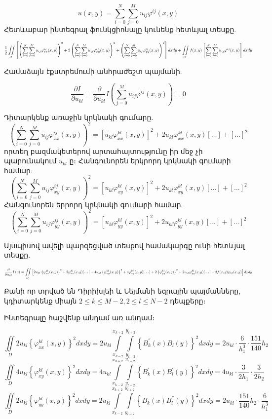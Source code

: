 \documentclass[fleqn, bachelor,subf,12pt,notitlepage]{disser}
\newcommand\scalemath[2]{\scalebox{#1}{\mbox{\ensuremath{\displaystyle #2}}}}
\begin{document}
					$$u(x,y) = \sum_{i=0}^{N} \sum_{j=0}^{M} u_{ij}\varphi^{ij}(x,y)$$
\noindent Հետևաբար ինտեգրալ ֆունկցիոնալը կունենք հետևյալ տեսքը.

$$\scalemath{0.7}{\frac{1}{2} \iint \limits_{D}\left[\left(\sum_{i=0}^{N} \sum_{j=0}^{M}u_{ij}\varphi^{ij}_{xx}(x,y)\right)^2 +  2\left(\sum_{i=0}^{N} \sum_{j=0}^{M}u_{ij}\varphi^{ij}_{xy}(x,y)\right)^2 + \left(\sum_{i=0}^{N} \sum_{j=0}^{M}u_{ij}\varphi^{ij}_{yy}(x,y)\right)^2\right]dxdy + \iint \limits_{D}f(x,y)\left[ \sum_{i=0}^{N} \sum_{j=0}^{M}u_{ij}\varphi^{ij}(x,y)\right]dxdy}$$


\noindent  Համաձայն էքստրեմումի անհրաժեշտ պայմանի.

$$\dfrac{\partial I}{ \partial u_{kl}} = \dfrac{\partial}{\partial u_{kl}} I \left(\sum_{j=0}^{M} u_{ij}\varphi^{ij}(x,y)\right) = 0 $$


\noindent Դիտարկենք առաջին կրկնակի գումարը.
$$\left(\sum_{i=0}^{N} \sum_{j=0}^{M}u_{ij}\varphi_{xx}^{ij}(x,y)\right)^2 = \left[u_{kl}\varphi_{xx}^{kl}(x,y)\right]^{2} + 2u_{kl}\varphi_{xx}^{kl}(x,y)[\dots] + [\dots]^2$$
\noindent որտեղ բազմակետերով արտահայտությունը իր մեջ չի պարունակում $u_{kl}$ ը։
Հանգունորեն երկրորդ կրկնակի գումարի համար.
$$\left(\sum_{i=0}^{N} \sum_{j=0}^{M}u_{ij}\varphi_{xy}^{ij}(x,y)\right)^2 = \left[u_{kl}\varphi_{xy}^{kl}(x,y)\right]^{2} + 2u_{kl}\varphi_{xy}^{kl}(x,y)[\dots] + [\dots]^2$$
Հանգունորեն երրորդ կրկնակի գումարի համար.
$$\left(\sum_{i=0}^{N} \sum_{j=0}^{M}u_{ij}\varphi_{yy}^{ij}(x,y)\right)^2 = \left[u_{kl}\varphi_{yy}^{kl}(x,y)\right]^{2} + 2u_{kl}\varphi_{yy}^{kl}(x,y)[\dots] + [\dots]^2$$



\noindent Այսպիսով ավելի պարզեցված տեսքով համակարգը ունի հետևյալ տեսքը.

$$\scalemath{0.65}{\frac{\partial}{\partial u_{kl}}I \left(u\right)= \iint \limits_{D} \left[2u_{kl}\left\{ \varphi_{xx}^{kl}(x,y)\right\}^{2} + 2\varphi_{xx}^{kl}(x,y)[\dots] + 4u_{kl}\left\{ \varphi_{xy}^{kl}(x,y)\right\}^{2} + 4\varphi_{xy}^{kl}(x,y)[\dots] + 2\left\{ \varphi_{yy}^{kl}(x,y)\right\}^{2} + 2u_{kl}\varphi_{yy}^{kl}(x,y)[\dots] + 2f(x,y)\varphi_{kl}(x,y)\right]dxdy}$$

Քանի որ տրված են Դիրիխլեի և Նեյմանի եզրային պայմանները, կդիտարկենք միայն $2 \leq k \leq M-2, 2 \leq l \leq N-2$ դեպքերը։ 

\noindent Ինտեգրալը հաշվենք անդամ առ անդամ։

$$\iint \limits_{D} 2u_{kl}\left\{ \varphi_{xx}^{kl}(x,y)\right\}^{2}dxdy=2u_{kl}\int \limits_{x_{k-2}}^{x_{k+2}}\int \limits_{y_{l-2}}^{y_{l+2}} \left\{ B_{k}^{''}(x)B_{l}(y)\right\}^{2}dxdy=2u_{kl}\cdot \dfrac{6}{h_{1}^{3}} \cdot \dfrac{151}{140}h_{2}$$
$$\iint \limits_{D} 4u_{kl}\left\{ \varphi_{xy}^{kl}(x,y)\right\}^{2}dxdy=4u_{kl}\int \limits_{x_{k-2}}^{x_{k+2}}\int \limits_{y_{l-2}}^{y_{l+2}} \left\{ B_{k}^{'}(x)B_{l}^{'}(y)\right\}^{2}dxdy=4u_{kl}\cdot \dfrac{3}{2h_{1}} \cdot \dfrac{3}{2h_{2}}$$
$$\iint \limits_{D} 2u_{kl}\left\{ \varphi_{yy}^{kl}(x,y)\right\}^{2}dxdy=2u_{kl}\int \limits_{x_{k-2}}^{x_{k+2}}\int \limits_{y_{l-2}}^{y_{l+2}} \left\{ B_{k}(x)B_{l}^{''}(y)\right\}^{2}dxdy=2u_{kl}\cdot \dfrac{151}{140}h_{2} \cdot \dfrac{6}{h_{1}^{3}}$$
\end{document}
